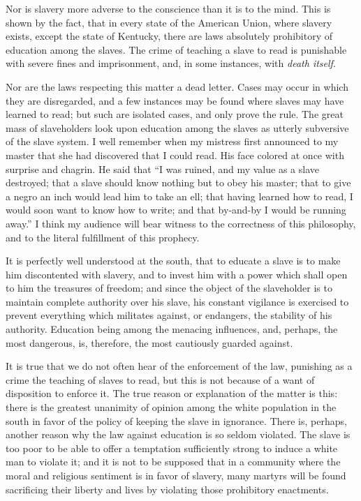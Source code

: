Nor is slavery more adverse to the conscience than it is to the mind.
This is shown by the fact, that in every state of the American Union,
where slavery exists, except the state of Kentucky, there are laws
absolutely prohibitory of education among the slaves.
{\protect\hypertarget{432}{}{}}The crime of teaching a slave to read is
punishable with severe fines and imprisonment, and, in some instances,
with \emph{death itself}.

Nor are the laws respecting this matter a dead letter. Cases may occur
in which they are disregarded, and a few instances may be found where
slaves may have learned to read; but such are isolated cases, and only
prove the rule. The great mass of slaveholders look upon education among
the slaves as utterly subversive of the slave system. I well remember
when my mistress first announced to my master that she had discovered
that I could read. His face colored at once with surprise and chagrin.
He said that ``I was ruined, and my value as a slave destroyed; that a
slave should know nothing but to obey his master; that to give a negro
an inch would lead him to take an ell; that having learned how to read,
I would soon want to know how to write; and that by-and-by I would be
running away.'' I think my audience will bear witness to the correctness
of this philosophy, and to the literal fulfillment of this prophecy.

It is perfectly well understood at the south, that to educate a slave is
to make him discontented with slavery, and to invest him with a power
which shall open to him the treasures of freedom; and since the object
of the slaveholder is to maintain complete authority over his slave, his
constant vigilance is exercised to prevent everything which militates
against, or endangers, the stability of his authority. Education being
among the menacing influences, and, perhaps, the most dangerous, is,
therefore, the most cautiously guarded against.

It is true that we do not often hear of the enforcement of the law,
punishing as a crime the teaching of slaves to read, but this is not
because of a want of disposition to enforce it. The true reason or
explanation of the matter is this: there is the greatest unanimity of
opinion among the white population in the south in favor of the policy
of keeping the slave in ignorance. There is, perhaps, another reason why
the law against education is so seldom violated. The slave is too poor
to be able to offer a temptation sufficiently strong to induce a white
man to violate it; and it is not to be supposed that in a community
where the moral and religious sentiment is in favor of slavery, many
martyrs will be found sacrificing their liberty and lives by violating
those prohibitory enactments.

